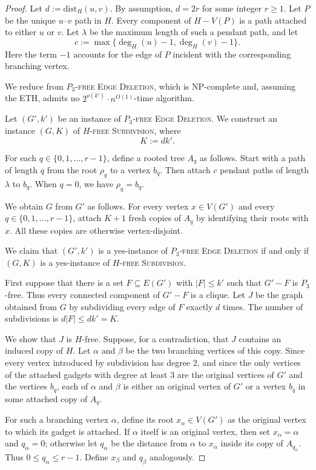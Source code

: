 \documentclass[a4paper,UKenglish,cleveref, autoref, thm-restate]{lipics-v2021}
\newcommand{\dist}{\mathrm{dist}}
\begin{document}
\begin{proof}
Let $d:=\dist_H(u,v)$. By assumption, $d=2r$ for some integer $r\geq 1$.
Let $P$ be the unique $u$--$v$ path in $H$.  Every component of
$H-V(P)$ is a path attached to either $u$ or $v$.  Let $\lambda$ be the
maximum length of such a pendant path, and let
\[
    c:=\max\{\deg_H(u)-1,\deg_H(v)-1\}.
\]
Here the term $-1$ accounts for the edge of $P$ incident with the corresponding
branching vertex.

We reduce from \textsc{$P_3$-free Edge Deletion}, which is \textsf{NP}-complete
and, assuming the ETH, admits no $2^{o(k')}\cdot n^{O(1)}$-time algorithm.

Let $(G',k')$ be an instance of \textsc{$P_3$-free Edge Deletion}.  We construct
an instance $(G,K)$ of \textsc{$H$-free Subdivision}, where
\[
    K:=d k'.
\]

For each $q\in\{0,1,\ldots,r-1\}$, define a rooted tree $A_q$ as follows.
Start with a path of length $q$ from the root $\rho_q$ to a vertex $b_q$.
Then attach $c$ pendant paths of length $\lambda$ to $b_q$.
When $q=0$, we have $\rho_q=b_q$.

We obtain $G$ from $G'$ as follows.  For every vertex $x\in V(G')$ and every
$q\in\{0,1,\ldots,r-1\}$, attach $K+1$ fresh copies of $A_q$ by identifying
their roots with $x$.  All these copies are otherwise vertex-disjoint.

We claim that $(G',k')$ is a yes-instance of
\textsc{$P_3$-free Edge Deletion} if and only if $(G,K)$ is a yes-instance of
\textsc{$H$-free Subdivision}.

First suppose that there is a set $F\subseteq E(G')$ with $|F|\leq k'$ such
that $G'-F$ is $P_3$-free.  Thus every connected component of $G'-F$ is a
clique.  Let $J$ be the graph obtained from $G$ by subdividing every edge of
$F$ exactly $d$ times.  The number of subdivisions is $d|F|\leq dk'=K$.

We show that $J$ is $H$-free.  Suppose, for a contradiction, that $J$ contains
an induced copy of $H$.  Let $\alpha$ and $\beta$ be the two branching vertices
of this copy.  Since every vertex introduced by subdivision has degree $2$, and
since the only vertices of the attached gadgets with degree at least $3$ are
the original vertices of $G'$ and the vertices $b_q$, each of $\alpha$ and
$\beta$ is either an original vertex of $G'$ or a vertex $b_q$ in some attached
copy of $A_q$.

For such a branching vertex $\alpha$, define its root $x_\alpha\in V(G')$ as
the original vertex to which its gadget is attached.  If $\alpha$ itself is an
original vertex, then set $x_\alpha=\alpha$ and $q_\alpha=0$; otherwise let
$q_\alpha$ be the distance from $\alpha$ to $x_\alpha$ inside its copy of
$A_{q_\alpha}$.  Thus $0\leq q_\alpha\leq r-1$.  Define $x_\beta$ and
$q_\beta$ analogously.


\end{proof}
\end{document}
